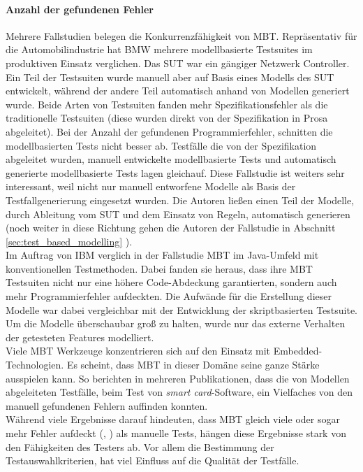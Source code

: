 \paragraph{Anzahl der gefundenen Fehler} Mehrere Fallstudien belegen die Konkurrenzfähigkeit von MBT. Repräsentativ für die Automobilindustrie hat BMW mehrere modellbasierte Testsuites im produktiven Einsatz verglichen\cite{pretschner_one_2005}. Das \Gls{SUT} war ein gängiger Netzwerk Controller. Ein Teil der Testsuiten wurde manuell aber auf Basis eines Modells des \Gls{SUT} entwickelt, während der andere Teil automatisch anhand von Modellen generiert wurde. Beide Arten von Testsuiten fanden mehr Spezifikationsfehler als die traditionelle Testsuiten (diese wurden direkt von der Spezifikation in Prosa abgeleitet). Bei der Anzahl der gefundenen Programmierfehler, schnitten die modellbasierten Tests nicht besser ab. Testfälle die von der Spezifikation abgeleitet wurden, manuell entwickelte modellbasierte Tests und automatisch generierte modellbasierte Tests lagen gleichauf. Diese Fallstudie ist weiters sehr interessant, weil nicht nur manuell entworfene Modelle als Basis der Testfallgenerierung eingesetzt wurden. Die Autoren ließen einen Teil der Modelle, durch Ableitung vom \Gls{SUT} und dem Einsatz von Regeln, automatisch generieren (noch weiter in diese Richtung gehen die Autoren der Fallstudie in Abschnitt \ref{sec:test_based_modelling} ).\\
Im Auftrag von IBM verglich \citeauthor{farchi_using_2002} in der Fallstudie \cite{farchi_using_2002} \Gls{MBT} im Java-Umfeld mit konventionellen Testmethoden. Dabei fanden sie heraus, dass ihre \Gls{MBT} Testsuiten nicht nur eine höhere Code-Abdeckung garantierten, sondern auch mehr Programmierfehler aufdeckten. Die Aufwände für die Erstellung dieser Modelle war dabei vergleichbar mit der Entwicklung der skriptbasierten Testsuite. Um die Modelle überschaubar groß zu halten, wurde nur das externe Verhalten der getesteten Features modelliert.\\
Viele \Gls{MBT} Werkzeuge konzentrieren sich auf den Einsatz mit Embedded-Technologien. Es scheint, dass \Gls{MBT} in dieser Domäne seine ganze Stärke ausspielen kann. So berichten \citeauthor{legeard_generation_2001} in mehreren Publikationen\cite{legeard_generation_2001}, dass die von Modellen abgeleiteten Testfälle,  beim Test von \textit{smart card}-Software, ein Vielfaches von den manuell gefundenen Fehlern auffinden konnten.\\
Während viele Ergebnisse darauf hindeuten, dass \Gls{MBT} gleich viele oder sogar mehr Fehler aufdeckt (\cite{dalal_model-based_1999}, \cite{legeard_generation_2001}) als manuelle Tests, hängen diese Ergebnisse stark von den Fähigkeiten des Testers ab. Vor allem die Bestimmung der Testauswahlkriterien, hat viel Einfluss auf die Qualität der Testfälle\cite{utting_practical_2007}.

